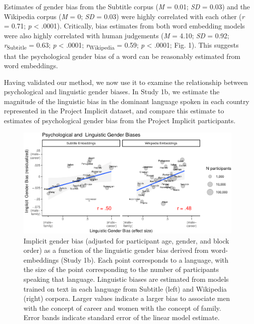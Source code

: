 \documentclass[9pt,twocolumn,twoside]{pnas-new}
\begin{document}
Estimates of gender bias from the Subtitle corpus (\emph{M} = 0.01;
\emph{SD} = 0.03) and the Wikipedia corpus (\emph{M} = 0; \emph{SD} =
0.03) were highly correlated with each other (\emph{r} = 0.71; \emph{p}
\textless{} .0001). Critically, bias estimates from both word embedding
models were also highly correlated with human judgements (\emph{M} =
4.10; \emph{SD} = 0.92; \emph{r}\textsubscript{Subtitle} = 0.63;
\emph{p} \textless{} .0001; \emph{r}\textsubscript{Wikipedia} = 0.59;
\emph{p} \textless{} .0001; Fig. 1). This suggests that the
psychological gender bias of a word can be reasonably estimated from
word embeddings.

Having validated our method, we now use it to examine the relationship
between psychological and linguistic gender biases. In Study 1b, we
estimate the magnitude of the linguistic bias in the dominant language
spoken in each country represented in the Project Implicit dataset, and
compare this estimate to estimates of psychological gender bias from the
Project Implicit participants.


\begin{figure}[t!]
\centering
\includegraphics{pnas_rmd/iat_lang_pnas_files/figure-latex/unnamed-chunk-11-1.pdf}
\caption{\label{fig:unnamed-chunk-11}Implicit gender bias (adjusted for participant age,
gender, and block order) as a function of the linguistic gender bias
derived from word-embeddings (Study 1b). Each point corresponds to a
language, with the size of the point corresponding to the number of
participants speaking that language. Linguistic biases are estimated
from models trained on text in each language from Subtitle (left) and
Wikipedia (right) corpora. Larger values indicate a larger bias to
associate men with the concept of career and women with the concept of
family. Error bands indicate standard error of the linear model
estimate.}
\end{figure}
\end{document}
